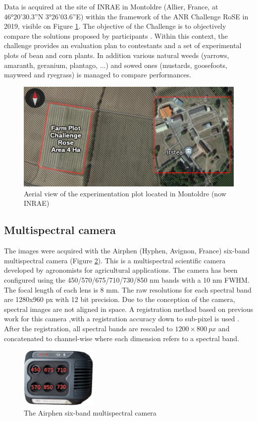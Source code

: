\documentclass[../thesis.tex]{subfiles}
\begin{document}
    Data is acquired at the site of INRAE in Montoldre (Allier, France, at 46°20'30.3”N 3°26'03.6”E) within the framework of the ANR Challenge RoSE in 2019, visible on Figure \ref{fig:parcelle-xp}. The objective of the Challenge is to objectively compare the solutions proposed by participants \cite{ChallengeRoSE, ChallengeRoSE2021}. Within this context, the challenge provides an evaluation plan to contestants and a set of experimental plots of bean and corn plants. In addition various natural weeds (yarrows, amaranth, geranium, plantago, ...) and sowed ones (mustards, goosefoots, mayweed and ryegrass) is managed to compare performances.
    
    \begin{figure}[H]
        \centering
        \includegraphics[width=0.5\linewidth]{img/features/parcelle-xp}
        \caption{Aerial view of the experimentation plot located in Montoldre (now INRAE)}
        \label{fig:parcelle-xp}
    \end{figure}
    
    \subsection{Multispectral camera}
    
    The images were acquired with the Airphen (Hyphen, Avignon, France) six-band multispectral camera (Figure \ref{fig:camera-airphen}). This is a multispectral scientific camera developed by agronomists for agricultural applications. The camera has been configured using the 450/570/675/710/730/850 nm bands with a 10 nm FWHM. The focal length of each lens is 8 mm. The raw resolutions for each spectral band are 1280x960 px with 12 bit precision. Due to the conception of the camera, spectral images are not aligned in space. A registration method based on previous work for this camera ,with a registration accuracy down to sub-pixel is used \cite{vayssade:hal-02499730}. After the registration, all spectral bands are rescaled to $1200 \times \SI{800}{px}$ and concatenated to channel-wise where each dimension refers to a spectral band.
    
    \begin{figure}[H]
        \centering
        \includegraphics[height=8em]{img/features/camera-airphen}
        \caption{The Airphen six-band multispectral camera}
        \label{fig:camera-airphen}
    \end{figure}
    
\end{document}
